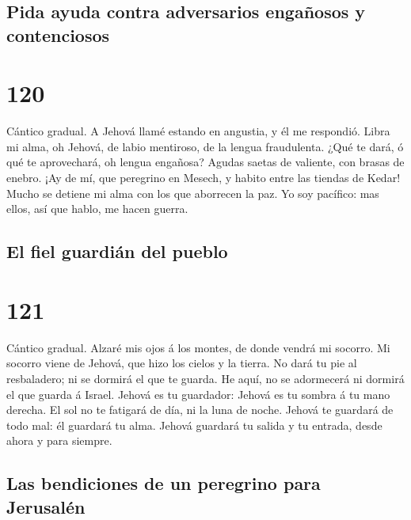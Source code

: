 \hypertarget{pida-ayuda-contra-adversarios-engauxf1osos-y-contenciosos}{%
\subsection{Pida ayuda contra adversarios engañosos y
contenciosos}\label{pida-ayuda-contra-adversarios-engauxf1osos-y-contenciosos}}

\hypertarget{section-119}{%
\section{120}\label{section-119}}

 Cántico gradual. A Jehová llamé estando en angustia, y él
me respondió.  Libra mi alma, oh Jehová, de labio mentiroso,
de la lengua fraudulenta.  ¿Qué te dará, ó qué te
aprovechará, oh lengua engañosa?  Agudas saetas de valiente,
con brasas de enebro.  ¡Ay de mí, que peregrino en Mesech, y
habito entre las tiendas de Kedar!  Mucho se detiene mi alma
con los que aborrecen la paz.  Yo soy pacífico: mas ellos,
así que hablo, me hacen guerra.

\hypertarget{el-fiel-guardiuxe1n-del-pueblo}{%
\subsection{El fiel guardián del
pueblo}\label{el-fiel-guardiuxe1n-del-pueblo}}

\hypertarget{section-120}{%
\section{121}\label{section-120}}

 Cántico gradual. Alzaré mis ojos á los montes, de donde
vendrá mi socorro.  Mi socorro viene de Jehová, que hizo los
cielos y la tierra.  No dará tu pie al resbaladero; ni se
dormirá el que te guarda.  He aquí, no se adormecerá ni
dormirá el que guarda á Israel.  Jehová es tu guardador:
Jehová es tu sombra á tu mano derecha.  El sol no te
fatigará de día, ni la luna de noche.  Jehová te guardará de
todo mal: él guardará tu alma.  Jehová guardará tu salida y
tu entrada, desde ahora y para siempre.

\hypertarget{las-bendiciones-de-un-peregrino-para-jerusaluxe9n}{%
\subsection{Las bendiciones de un peregrino para
Jerusalén}\label{las-bendiciones-de-un-peregrino-para-jerusaluxe9n}}

